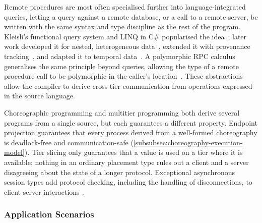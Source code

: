 Remote procedures are most often specialised further into language-integrated queries,
letting a query against a remote database, or a call to a remote server, be written with the same syntax and type discipline as the rest of the program.
%
Kleisli's functional query system and \ac{LINQ} in C\# popularised the idea~\cite{wong2000kleisli,Torgersen:2007};
later work developed it for nested, heterogeneous data~\cite{10.1007/978-3-030-72019-3_21},
extended it with provenance tracking~\cite{10.1145/3315507.3330198},
and adapted it to temporal data~\cite{10.1145/3564719.3568690}.
%
A polymorphic \ac{RPC} calculus generalises the same principle beyond queries,
allowing the type of a remote procedure call to be polymorphic in the caller's location~\cite{CHOI2020102499}.
%
These abstractions allow the compiler to derive cross-tier communication from operations expressed in the source language.

Choreographic programming and multitier programming both derive several programs from a single source, but each guarantees a different property.
%
Endpoint projection guarantees that every process derived from a well-formed choreography is deadlock-free and communication-safe (\cref{subsubsec:choreography-execution-model}).
%
Tier slicing only guarantees that a value is used on a tier where it is available;
nothing in an ordinary placement type rules out a client and a server disagreeing about the state of a longer protocol.
%
Exceptional asynchronous session types add protocol checking,
including the handling of disconnections,
to client-server interactions~\cite{10.1145/3290341}.

\subsubsection{Application Scenarios}
\label{subsubsec:multitier-application-scenarios}


